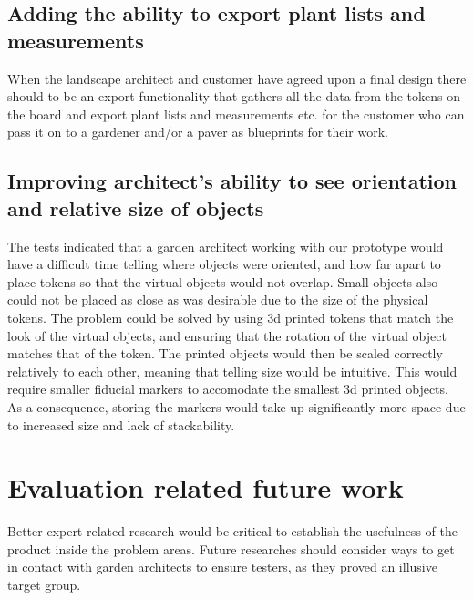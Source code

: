 \subsection*{Adding the ability to export plant lists and measurements}
When the landscape architect and customer have agreed upon a final design there should to be an export functionality that gathers all the data from the tokens on the board and export plant lists and measurements etc. for the customer who can pass it on to a gardener and/or a paver as blueprints for their work.

\subsection*{Improving architect's ability to see orientation and relative size of objects}
The tests indicated that a garden architect working with our prototype would have a difficult time telling where objects were oriented, and how far apart to place tokens so that the virtual objects would not overlap. Small objects also could not be placed as close as was desirable due to the size of the physical tokens. The problem could be solved by using 3d printed tokens that match the look of the virtual objects, and ensuring that the rotation of the virtual object matches that of the token. The printed objects would then be scaled correctly relatively to each other, meaning that telling size would be intuitive. This would require smaller fiducial markers to accomodate the smallest 3d printed objects. As a consequence, storing the markers would take up significantly more space due to increased size and lack of stackability. 

\section{Evaluation related future work}

Better expert related research would be critical to establish the usefulness of the product inside the problem areas. Future researches should consider ways to get in contact with garden architects to ensure testers, as they proved an illusive target group.
